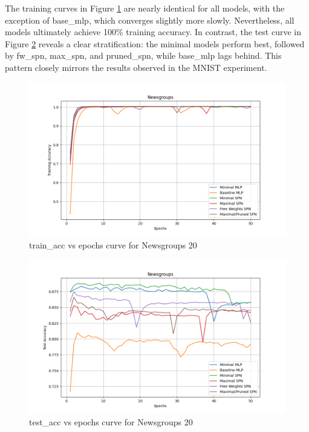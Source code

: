 The training curves in Figure \ref{fig:newsgroupsTrainCurve} are nearly identical for all models, with the exception of base\_mlp, which converges slightly more slowly. Nevertheless, all models ultimately achieve 100\% training accuracy. In contrast, the test curve in Figure \ref{fig:newsgroupsTestCurve} reveals a clear stratification: the minimal models perform best, followed by fw\_spn, max\_spn, and pruned\_spn, while base\_mlp lags behind. This pattern closely mirrors the results observed in the MNIST experiment.

\begin{figure}[H]
    \centering
    \includegraphics[width=\linewidth]{Figures/Results/Newsgroups/training_accuracy_plot.png} %
    \captionsetup{width=\linewidth}
    \caption{train\_acc vs epochs curve for Newsgroups 20}
    \label{fig:newsgroupsTrainCurve}
\end{figure}

\begin{figure}[H]
    \centering
    \includegraphics[width=\linewidth]{Figures/Results/Newsgroups/test_accuracy_plot.png} %
    \captionsetup{width=\linewidth}
    \caption{test\_acc vs epochs curve for Newsgroups 20}
    \label{fig:newsgroupsTestCurve}
\end{figure}

